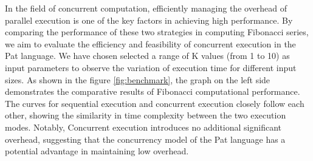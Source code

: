 \documentclass{l4proj}
\begin{document}
\begin{table}[ht]
\centering
\renewcommand{\arraystretch}{1.1}
\caption{Part list of savina benchmarks}
\label{Savina}
\end{table}

In the field of concurrent computation, efficiently managing the overhead of parallel execution is one of the key factors in achieving high performance. By comparing the performance of these two strategies in computing Fibonacci series, we aim to evaluate the efficiency and feasibility of concurrent execution in the Pat language. We have chosen selected a range of K values (from 1 to 10) as input parameters to observe the variation of execution time for different input sizes. As shown in the figure \ref{fig:benchmark}, the graph on the left side demonstrates the comparative results of Fibonacci computational performance. The curves for sequential execution and concurrent execution closely follow each other, showing the similarity in time complexity between the two execution modes. Notably, Concurrent execution introduces no additional significant overhead, suggesting that the concurrency model of the Pat language has a potential advantage in maintaining low overhead.
\end{document}
